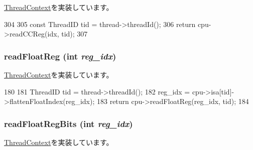 \hyperlink{classThreadContext_aa6d1af2db95563430c5ce31b38838a93}{ThreadContext}を実装しています。


\begin{DoxyCode}
304 {
305     const ThreadID tid = thread->threadId();
306     return cpu->readCCReg(idx, tid);
307 }
\end{DoxyCode}
\hypertarget{classInOrderThreadContext_a2f97d83baef4fbda00b7f7f62779752f}{
\subsubsection[{readFloatReg}]{ readFloatReg (int {\em reg\_\-idx})}}
\label{classInOrderThreadContext_a2f97d83baef4fbda00b7f7f62779752f}


\hyperlink{classThreadContext_a7883083f396dee2160e4b8640d02f5f6}{ThreadContext}を実装しています。


\begin{DoxyCode}
180 {
181     ThreadID tid = thread->threadId();
182     reg_idx = cpu->isa[tid]->flattenFloatIndex(reg_idx);
183     return cpu->readFloatReg(reg_idx, tid);
184 }
\end{DoxyCode}
\hypertarget{classInOrderThreadContext_a4998e6615f835676762af364eff198e3}{
\subsubsection[{readFloatRegBits}]{ readFloatRegBits (int {\em reg\_\-idx})}}
\label{classInOrderThreadContext_a4998e6615f835676762af364eff198e3}


\hyperlink{classThreadContext_a66bf9e1bf11ad15d1903209dd37014c5}{ThreadContext}を実装しています。


